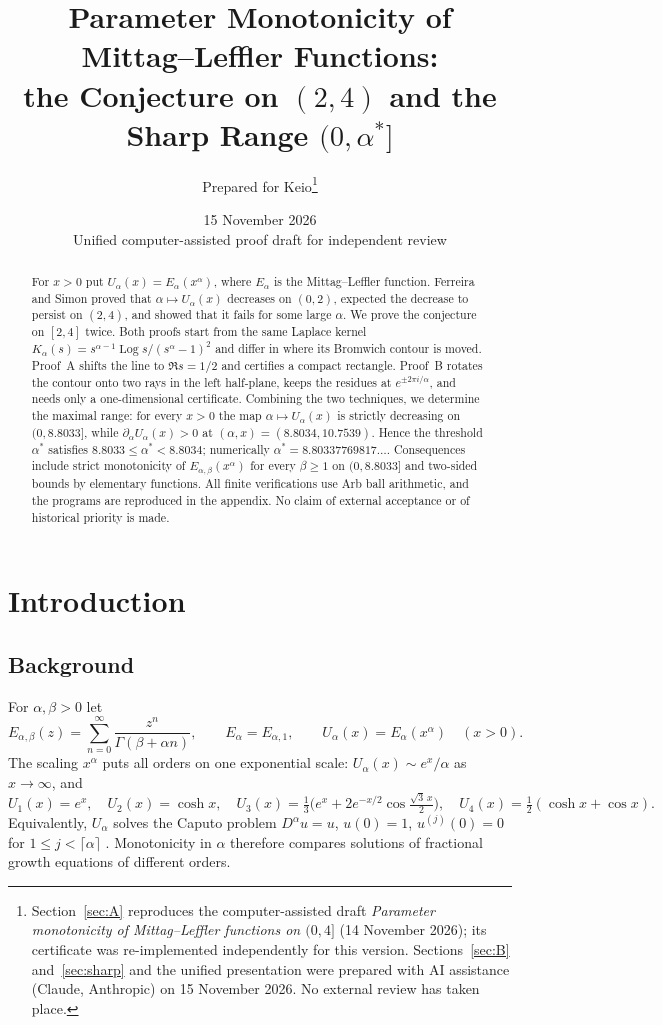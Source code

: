 \documentclass[11pt,a4paper]{article}
\title{\color{navy}Parameter Monotonicity of Mittag--Leffler Functions:\\
the Conjecture on $(2,4)$ and the Sharp Range $(0,\alpha^*]$}
\author{Prepared for Keio\thanks{Section~\ref{sec:A} reproduces the computer-assisted draft
\emph{Parameter monotonicity of Mittag--Leffler functions on $(0,4]$} (14 November 2026); its
certificate was re-implemented independently for this version. Sections~\ref{sec:B}
and~\ref{sec:sharp} and the unified presentation were prepared with AI assistance
(Claude, Anthropic) on 15 November 2026. No external review has taken place.}}
\date{15 November 2026\\\small Unified computer-assisted proof draft for independent review}
\theoremstyle{plain}
\theoremstyle{remark}
\DeclareMathOperator{\Log}{Log}
\begin{document}
\maketitle

\begin{abstract}
For $x>0$ put $U_\alpha(x)=E_\alpha(x^\alpha)$, where $E_\alpha$ is the Mittag--Leffler
function. Ferreira and Simon proved that $\alpha\mapsto U_\alpha(x)$ decreases on $(0,2)$,
expected the decrease to persist on $(2,4)$, and showed that it fails for some large $\alpha$.
We prove the conjecture on $[2,4]$ twice. Both proofs start from the same Laplace kernel
$K_\alpha(s)=s^{\alpha-1}\Log s/(s^\alpha-1)^2$ and differ in where its Bromwich contour is moved.
Proof~A shifts the line to $\Re s=1/2$ and certifies a compact rectangle. Proof~B rotates the
contour onto two rays in the left half-plane, keeps the residues at $e^{\pm2\pi i/\alpha}$, and
needs only a one-dimensional certificate. Combining the two techniques, we determine the maximal
range: for every $x>0$ the map $\alpha\mapsto U_\alpha(x)$ is strictly decreasing on
$(0,8.8033]$, while $\partial_\alpha U_\alpha(x)>0$ at $(\alpha,x)=(8.8034,10.7539)$. Hence the
threshold $\alpha^*$ satisfies $8.8033\le\alpha^*<8.8034$; numerically
$\alpha^*=8.80337769817\ldots$. Consequences include strict monotonicity of
$E_{\alpha,\beta}(x^\alpha)$ for every $\beta\ge1$ on $(0,8.8033]$ and two-sided bounds by
elementary functions. All finite verifications use Arb ball arithmetic, and the programs are
reproduced in the appendix. No claim of external acceptance or of historical priority is made.
\end{abstract}

\tableofcontents

\section{Introduction}\label{sec:intro}
\subsection{Background}
For $\alpha,\beta>0$ let
\[
 E_{\alpha,\beta}(z)=\sum_{n=0}^{\infty}\frac{z^n}{\Gamma(\beta+\alpha n)},\qquad
 E_\alpha=E_{\alpha,1},\qquad U_\alpha(x)=E_\alpha(x^\alpha)\quad(x>0).
\]
The scaling $x^\alpha$ puts all orders on one exponential scale: $U_\alpha(x)\sim e^x/\alpha$
as $x\to\infty$, and
\[
 U_1(x)=e^x,\quad U_2(x)=\cosh x,\quad
 U_3(x)=\tfrac13\bigl(e^x+2e^{-x/2}\cos\tfrac{\sqrt3\,x}{2}\bigr),\quad
 U_4(x)=\tfrac12(\cosh x+\cos x).
\]
Equivalently, $U_\alpha$ solves the Caputo problem $D^\alpha u=u$, $u(0)=1$,
$u^{(j)}(0)=0$ for $1\le j<\lceil\alpha\rceil$ \cite{GKMR}. Monotonicity in $\alpha$ therefore
compares solutions of fractional growth equations of different orders.
\end{document}
